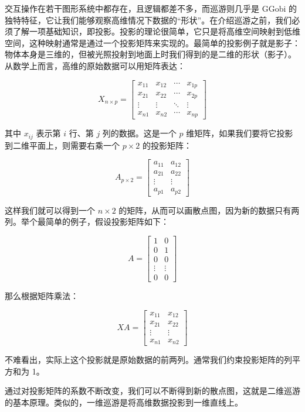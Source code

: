 \documentclass[
  b5paper,
  UTF8,twoside]{book}
\begin{document}
交互操作在若干图形系统中都存在，且逻辑都差不多，而巡游则几乎是 GGobi 的独特特征，它让我们能够观察高维情况下数据的``形状''。在介绍巡游之前，我们必须了解一项基础知识，即投影。投影的理论很简单，它只是将高维空间映射到低维空间，这种映射通常是通过一个投影矩阵来实现的。最简单的投影例子就是影子：物体本身是三维的，但被光照投射到地面上时我们得到的是二维的形状（影子）。从数学上而言，高维的原始数据可以用矩阵表达：

\[X_{n\times p} = \left[\begin{array}{cccc}
x_{11} & x_{12} & \cdots & x_{1p}\\
x_{21} & x_{22} & \cdots & x_{2p}\\
\vdots & \vdots & \ddots & \vdots\\
x_{n1} & x_{n2} & \cdots & x_{np}
\end{array}\right]\]

其中 \(x_{ij}\) 表示第 \(i\) 行、第 \(j\) 列的数据。这是一个 \(p\) 维矩阵，如果我们要将它投影到二维平面上，则需要右乘一个 \(p\times2\) 的投影矩阵：

\[A_{p\times2} = \left[\begin{array}{cc}
a_{11} & a_{12}\\
a_{21} & a_{22}\\
\vdots & \vdots\\
a_{p1} & a_{p2}
\end{array}\right]\]

这样我们就可以得到一个 \(n\times2\) 的矩阵，从而可以画散点图，因为新的数据只有两列。举个最简单的例子，假设投影矩阵如下：

\[A = \left[\begin{array}{cc}
1 & 0\\
0 & 1\\
0 & 0\\
\vdots & \vdots\\
0 & 0
\end{array}\right]\]

那么根据矩阵乘法：

\[XA = \left[\begin{array}{cc}
x_{11} & x_{12}\\
x_{21} & x_{22}\\
\vdots & \vdots\\
x_{n1} & x_{n2}
\end{array}\right]\]

不难看出，实际上这个投影就是原始数据的前两列。通常我们约束投影矩阵的列平方和为 1。

通过对投影矩阵的系数不断改变，我们可以不断得到新的散点图，这就是二维巡游的基本原理。类似的，一维巡游是将高维数据投影到一维直线上。
\end{document}
